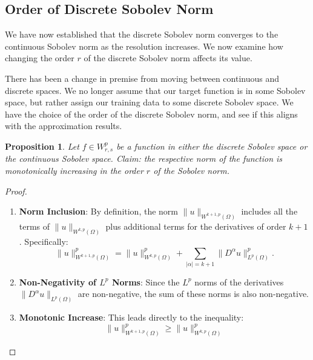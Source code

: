 \documentclass[11pt,a4paper]{article}
\theoremstyle{plain}
\newtheorem{proposition}[theorem]{Proposition}
\theoremstyle{definition}
\theoremstyle{remark}
\begin{document}
\subsection{Order of Discrete Sobolev Norm}

We have now established that the discrete Sobolev norm converges to the continuous Sobolev norm as the resolution increases. We now examine how changing the order \(r\) of the discrete Sobolev norm affects its value.

There has been a change in premise from moving between continuous and discrete spaces. We no longer assume that our target function is in some Sobolev space, but rather assign our training data to some discrete Sobolev space. We have the choice of the order of the discrete Sobolev norm, and see if this aligns with the approximation results.

\begin{proposition}
    Let \( f \in W^{p}_{r,s} \) be a function in either the discrete Sobolev space or the continuous Sobolev space.
    Claim: the respective norm of the function is monotonically increasing in the order \( r \) of the Sobolev norm.
\end{proposition}
\begin{proof}
\begin{enumerate}
    \item \textbf{Norm Inclusion}: By definition, the norm \( \|u\|_{W^{k+1,p}(\Omega)} \) includes all the terms of \( \|u\|_{W^{k,p}(\Omega)} \) plus additional terms for the derivatives of order \( k+1 \). Specifically:
    \[
    \|u\|_{W^{k+1,p}(\Omega)}^p = \|u\|_{W^{k,p}(\Omega)}^p + \sum_{|\alpha| = k+1} \|D^\alpha u\|_{L^p(\Omega)}^p.
    \]

    \item \textbf{Non-Negativity of \( L^p \) Norms}: Since the \( L^p \) norms of the derivatives \( \|D^\alpha u\|_{L^p(\Omega)} \) are non-negative, the sum of these norms is also non-negative.

    \item \textbf{Monotonic Increase}: This leads directly to the inequality:
    \[
    \| u\|_{W^{k+1,p}(\Omega)}^p \geq \|u\|_{W^{k,p}(\Omega)}^p
    \]
\end{enumerate}
\end{proof}
\end{document}

